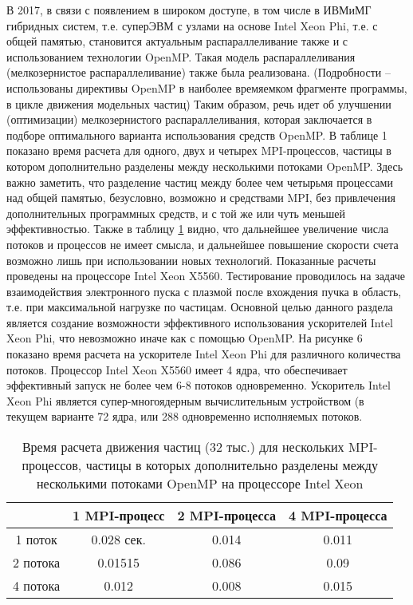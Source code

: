 В 2017, в связи с появлением в широком доступе, в том числе в ИВМиМГ гибридных систем, т.е. суперЭВМ с узлами на основе Intel Xeon Phi, т.е. с общей памятью, становится актуальным распараллеливание также и с использованием технологии OpenMP. Такая модель распараллеливания (мелкозернистое распараллеливание) также была реализована. (Подробности – использованы директивы OpenMP в наиболее времяемком фрагменте программы, в цикле движения модельных частиц) Таким образом, речь идет об улучшении (оптимизации) мелкозернистого распараллеливания, которая заключается в подборе оптимального варианта использования средств OpenMP. 
В таблице 1 показано время расчета для одного, двух и четырех MPI-процессов, частицы в котором дополнительно разделены между несколькими потоками OpenMP. Здесь важно заметить, что разделение частиц между более чем четырьмя процессами над общей памятью, безусловно, возможно и средствами MPI, без привлечения дополнительных программных средств, и с той же или чуть меньшей эффективностью. Также в таблицу \ref{tabXeon} видно, что дальнейшее увеличение числа потоков и процессов не имеет смысла, и дальнейшее повышение скорости счета возможно лишь при использовании новых технологий. Показанные расчеты проведены на процессоре Intel Xeon X5560. Тестирование проводилось на задаче взаимодействия электронного пуска с плазмой после вхождения пучка в область, т.е. при максимальной нагрузке по частицам.
Основной целью данного раздела является создание возможности эффективного использования ускорителей Intel Xeon Phi, что невозможно иначе как с помощью OpenMP. На рисунке 6 показано время расчета на ускорителе Intel Xeon Phi  для различного количества потоков. Процессор Intel Xeon X5560 имеет 4 ядра, что обеспечивает эффективный запуск не более чем 6-8 потоков одновременно. Ускоритель Intel Xeon Phi является супер-многоядерным вычислительным устройством (в текущем варианте 72 ядра, или 288 одновременно исполняемых потоков.


\begin{table} [htbp]
	\centering
	\changecaptionwidth\captionwidth{15cm}
	\caption{Время расчета движения частиц (32 тыс.) для нескольких MPI-процессов, частицы в которых дополнительно разделены между несколькими потоками OpenMP на процессоре Intel Xeon}
	\label{tabXeon}%
	\begin{tabular}{| c | c | c| c|}
		\hline
          &  1 MPI-процесс & 2 MPI-процесса & 4 MPI-процесса \\ \hline
1 поток   & 0.028 сек.     & 0.014          & 0.011          \\ \hline
2 потока  & 0.01515        & 0.086          & 0.09           \\ \hline
4 потока  & 0.012          & 0.008          & 0.015          \\ \hline
	\end{tabular}
\end{table}

